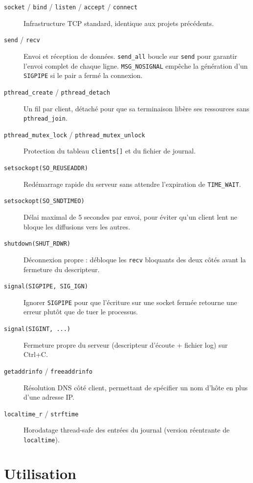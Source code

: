 \documentclass[12pt,a4paper]{article}
\begin{document}
\begin{description}
    \item[\texttt{socket} / \texttt{bind} / \texttt{listen} / \texttt{accept} / \texttt{connect}]
        Infrastructure TCP standard, identique aux projets précédents.
    \item[\texttt{send} / \texttt{recv}]
        Envoi et réception de données. \texttt{send\_all} boucle sur
        \texttt{send} pour garantir l'envoi complet de chaque ligne.
        \texttt{MSG\_NOSIGNAL} empêche la génération d'un \texttt{SIGPIPE}
        si le pair a fermé la connexion.
    \item[\texttt{pthread\_create} / \texttt{pthread\_detach}]
        Un fil par client, détaché pour que sa terminaison libère ses
        ressources sans \texttt{pthread\_join}.
    \item[\texttt{pthread\_mutex\_lock} / \texttt{pthread\_mutex\_unlock}]
        Protection du tableau \texttt{clients[]} et du fichier de journal.
    \item[\texttt{setsockopt(SO\_REUSEADDR)}]
        Redémarrage rapide du serveur sans attendre l'expiration de
        \texttt{TIME\_WAIT}.
    \item[\texttt{setsockopt(SO\_SNDTIMEO)}]
        Délai maximal de 5 secondes par envoi, pour éviter qu'un client
        lent ne bloque les diffusions vers les autres.
    \item[\texttt{shutdown(SHUT\_RDWR)}]
        Déconnexion propre : débloque les \texttt{recv} bloquants des deux
        côtés avant la fermeture du descripteur.
    \item[\texttt{signal(SIGPIPE, SIG\_IGN)}]
        Ignorer \texttt{SIGPIPE} pour que l'écriture sur une socket fermée
        retourne une erreur plutôt que de tuer le processus.
    \item[\texttt{signal(SIGINT, ...)}]
        Fermeture propre du serveur (descripteur d'écoute + fichier log)
        sur Ctrl+C.
    \item[\texttt{getaddrinfo} / \texttt{freeaddrinfo}]
        Résolution DNS côté client, permettant de spécifier un nom d'hôte
        en plus d'une adresse IP.
    \item[\texttt{localtime\_r} / \texttt{strftime}]
        Horodatage thread-safe des entrées du journal (version réentrante
        de \texttt{localtime}).
\end{description}

\section{Utilisation}
\end{document}
